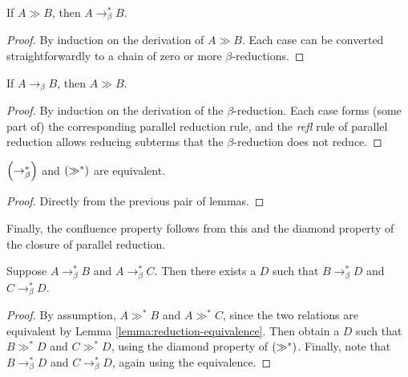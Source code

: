 \begin{lemma}
If \(A \gg B\), then \(A \to_\beta^* B\).
\end{lemma}
\begin{proof}
By induction on the derivation of \(A \gg B\).
Each case can be converted straightforwardly to a chain of zero or more \(\beta\)-reductions.
\end{proof}

\begin{lemma}
If \(A \to_\beta B\), then \(A \gg B\).
\end{lemma}
\begin{proof}
By induction on the derivation of the \(\beta\)-reduction.
Each case forms (some part of) the corresponding parallel reduction rule, and the \emph{refl} rule of parallel reduction allows reducing subterms that the \(\beta\)-reduction does not reduce.
\end{proof}

\begin{lemma}
\label{lemma:reduction-equivalence}
\(\left(\to_\beta^*\right)\) and \(\left(\gg^*\right)\) are equivalent.
\end{lemma}
\begin{proof}
Directly from the previous pair of lemmas.
\end{proof}

Finally, the confluence property follows from this and the diamond property of the closure of parallel reduction.

\begin{theorem}
Suppose \(A \to_\beta^* B\) and \(A \to_\beta^* C\).
Then there exists a \(D\) such that \(B \to_\beta^* D\) and \(C \to_\beta^* D\).
\end{theorem}
\begin{proof}
By assumption, \(A \gg^* B\) and \(A \gg^* C\), since the two relations are equivalent by Lemma \ref{lemma:reduction-equivalence}.
Then obtain a \(D\) such that \(B \gg^* D\) and \(C \gg^* D\), using the diamond property of \(\left(\gg^*\right)\).
Finally, note that \(B \to_\beta^* D\) and \(C \to_\beta^* D\), again using the equivalence.
\end{proof}
